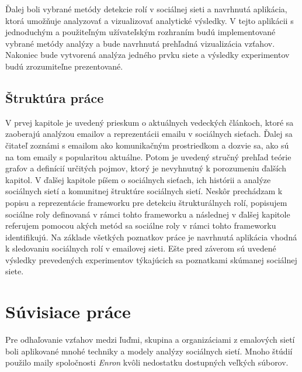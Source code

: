 \documentclass[slovak,master,public,dept460,male,cpdeclaration,oneside]{diploma}
\begin{document}
Ďalej boli vybrané metódy detekcie rolí v sociálnej sieti a navrhnutá aplikácia, ktorá umožňuje analyzovať a vizualizovať analytické výsledky. V tejto aplikácii s jednoduchým a použiteľným užívateľským rozhraním budú implementované vybrané metódy analýzy a bude navrhnutá prehľadná vizualizácia vzťahov. Nakoniec bude vytvorená analýza jedného prvku siete a výsledky experimentov budú zrozumiteľne prezentované.

\subsection{Štruktúra práce}
V prvej kapitole je uvedený prieskum o aktuálnych vedeckých článkoch, ktoré sa zaoberajú analýzou emailov a reprezentácii emailu v sociálnych sieťach. Ďalej sa čitateľ zoznámi s emailom ako komunikačným prostriedkom a dozvie sa, ako sú na tom emaily s popularitou aktuálne. Potom je uvedený stručný prehľad teórie grafov a definícií určitých pojmov, ktorý je nevyhnutný k porozumeniu ďalších kapitol. V ďalšej kapitole píšem o sociálnych sieťach, ich histórii a analýze sociálnych sietí a komunitnej štruktúre sociálnych sietí. Neskôr prechádzam k popisu a reprezentácie frameworku pre detekciu štrukturálnych rolí, popisujem sociálne roly definovaná v rámci tohto frameworku a následnej v ďalšej kapitole referujem pomocou akých metód sa sociálne roly v rámci tohto frameworku identifikujú. Na základe všetkých poznatkov práce je navrhnutá aplikácia vhodná k sledovaniu sociálnych rolí v emailovej sieti.  Ešte pred záverom sú uvedené výsledky prevedených experimentov týkajúcich sa poznatkami skúmanej sociálnej siete.


\section{Súvisiace práce}

Pre odhaľovanie vzťahov medzi ľuďmi, skupina a organizáciami z emalových sietí boli aplikované mnohé techniky a modely analýzy sociálnych sietí. Mnoho štúdií použilo maily spoločnosti \textit{Enron} kvôli nedostatku dostupných veľkých súborov. 
\end{document}
